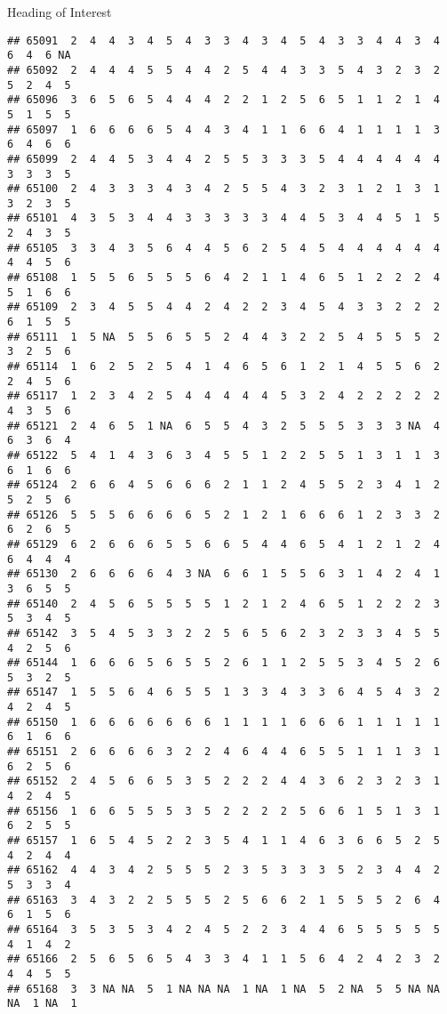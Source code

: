 \documentclass[
  ignorenonframetext,
]{beamer}
\begin{document}
\begin{frame}[fragile]{Heading of Interest}
\begin{verbatim}
## 65091  2  4  4  3  4  5  4  3  3  4  3  4  5  4  3  3  4  4  3  4  6  4  6 NA
## 65092  2  4  4  4  5  5  4  4  2  5  4  4  3  3  5  4  3  2  3  2  5  2  4  5
## 65096  3  6  5  6  5  4  4  4  2  2  1  2  5  6  5  1  1  2  1  4  5  1  5  5
## 65097  1  6  6  6  6  5  4  4  3  4  1  1  6  6  4  1  1  1  1  3  6  4  6  6
## 65099  2  4  4  5  3  4  4  2  5  5  3  3  3  5  4  4  4  4  4  4  3  3  3  5
## 65100  2  4  3  3  3  4  3  4  2  5  5  4  3  2  3  1  2  1  3  1  3  2  3  5
## 65101  4  3  5  3  4  4  3  3  3  3  3  4  4  5  3  4  4  5  1  5  2  4  3  5
## 65105  3  3  4  3  5  6  4  4  5  6  2  5  4  5  4  4  4  4  4  4  4  4  5  6
## 65108  1  5  5  6  5  5  5  6  4  2  1  1  4  6  5  1  2  2  2  4  5  1  6  6
## 65109  2  3  4  5  5  4  4  2  4  2  2  3  4  5  4  3  3  2  2  2  6  1  5  5
## 65111  1  5 NA  5  5  6  5  5  2  4  4  3  2  2  5  4  5  5  5  2  3  2  5  6
## 65114  1  6  2  5  2  5  4  1  4  6  5  6  1  2  1  4  5  5  6  2  2  4  5  6
## 65117  1  2  3  4  2  5  4  4  4  4  4  5  3  2  4  2  2  2  2  2  4  3  5  6
## 65121  2  4  6  5  1 NA  6  5  5  4  3  2  5  5  5  3  3  3 NA  4  6  3  6  4
## 65122  5  4  1  4  3  6  3  4  5  5  1  2  2  5  5  1  3  1  1  3  6  1  6  6
## 65124  2  6  6  4  5  6  6  6  2  1  1  2  4  5  5  2  3  4  1  2  5  2  5  6
## 65126  5  5  5  6  6  6  6  5  2  1  2  1  6  6  6  1  2  3  3  2  6  2  6  5
## 65129  6  2  6  6  6  5  5  6  6  5  4  4  6  5  4  1  2  1  2  4  6  4  4  4
## 65130  2  6  6  6  6  4  3 NA  6  6  1  5  5  6  3  1  4  2  4  1  3  6  5  5
## 65140  2  4  5  6  5  5  5  5  1  2  1  2  4  6  5  1  2  2  2  3  5  3  4  5
## 65142  3  5  4  5  3  3  2  2  5  6  5  6  2  3  2  3  3  4  5  5  4  2  5  6
## 65144  1  6  6  6  5  6  5  5  2  6  1  1  2  5  5  3  4  5  2  6  5  3  2  5
## 65147  1  5  5  6  4  6  5  5  1  3  3  4  3  3  6  4  5  4  3  2  4  2  4  5
## 65150  1  6  6  6  6  6  6  6  1  1  1  1  6  6  6  1  1  1  1  1  6  1  6  6
## 65151  2  6  6  6  6  3  2  2  4  6  4  4  6  5  5  1  1  1  3  1  6  2  5  6
## 65152  2  4  5  6  6  5  3  5  2  2  2  4  4  3  6  2  3  2  3  1  4  2  4  5
## 65156  1  6  6  5  5  5  3  5  2  2  2  2  5  6  6  1  5  1  3  1  6  2  5  5
## 65157  1  6  5  4  5  2  2  3  5  4  1  1  4  6  3  6  6  5  2  5  4  2  4  4
## 65162  4  4  3  4  2  5  5  5  2  3  5  3  3  3  5  2  3  4  4  2  5  3  3  4
## 65163  3  4  3  2  2  5  5  5  2  5  6  6  2  1  5  5  5  2  6  4  6  1  5  6
## 65164  3  5  3  5  3  4  2  4  5  2  2  3  4  4  6  5  5  5  5  5  4  1  4  2
## 65166  2  5  6  5  6  5  4  3  3  4  1  1  5  6  4  2  4  2  3  2  4  4  5  5
## 65168  3  3 NA NA  5  1 NA NA NA  1 NA  1 NA  5  2 NA  5  5 NA NA NA  1 NA  1

\end{verbatim}
\end{frame}
\end{document}
